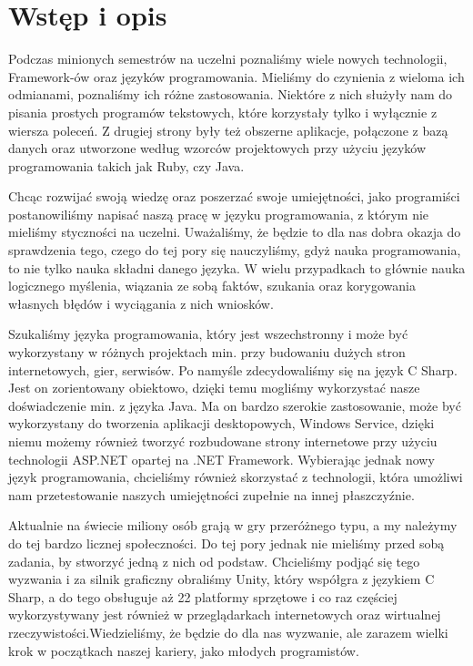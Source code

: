 \section{Wstęp i opis}
Podczas minionych semestrów na uczelni poznaliśmy wiele nowych technologii, Framework-ów oraz języków programowania. Mieliśmy do czynienia z wieloma ich odmianami, poznaliśmy ich różne zastosowania. Niektóre z nich służyły nam do pisania prostych programów tekstowych, które korzystały tylko i wyłącznie z wiersza poleceń. Z drugiej strony były też obszerne aplikacje, połączone z bazą danych oraz utworzone według wzorców projektowych przy użyciu  języków programowania takich jak Ruby, czy Java. 

Chcąc rozwijać swoją wiedzę oraz poszerzać swoje umiejętności, jako programiści postanowiliśmy napisać naszą pracę w języku programowania, z którym nie mieliśmy styczności na uczelni. Uważaliśmy, że będzie to dla nas dobra okazja do sprawdzenia tego, czego do tej pory się nauczyliśmy, gdyż nauka programowania, to nie tylko nauka składni danego języka. W wielu przypadkach to głównie nauka logicznego myślenia, wiązania ze sobą faktów, szukania oraz korygowania własnych błędów i wyciągania z nich wniosków. 

Szukaliśmy języka programowania, który jest wszechstronny i może być wykorzystany w różnych projektach min. przy budowaniu dużych stron internetowych, gier, serwisów. Po namyśle zdecydowaliśmy się na język C Sharp. Jest on zorientowany obiektowo, dzięki temu mogliśmy wykorzystać nasze doświadczenie min. z języka Java.  Ma on bardzo szerokie zastosowanie, może być wykorzystany do tworzenia aplikacji desktopowych, Windows Service, dzięki niemu możemy również tworzyć rozbudowane strony internetowe przy użyciu technologii ASP.NET opartej na .NET Framework. Wybierając jednak nowy język programowania, chcieliśmy również skorzystać z technologii, która umożliwi nam przetestowanie naszych umiejętności zupełnie na innej płaszczyźnie.

Aktualnie na świecie miliony osób grają w gry przeróżnego typu, a my należymy do tej bardzo licznej społeczności. Do tej pory jednak nie mieliśmy przed sobą zadania, by stworzyć jedną z nich od podstaw. Chcieliśmy podjąć się tego wyzwania i za silnik graficzny obraliśmy Unity, który współgra z językiem C Sharp, a do tego obsługuje aż 22 platformy sprzętowe i co raz częściej wykorzystywany jest również w przeglądarkach internetowych oraz wirtualnej rzeczywistości.Wiedzieliśmy, że będzie do dla nas wyzwanie, ale zarazem wielki krok w początkach naszej kariery, jako młodych programistów.


